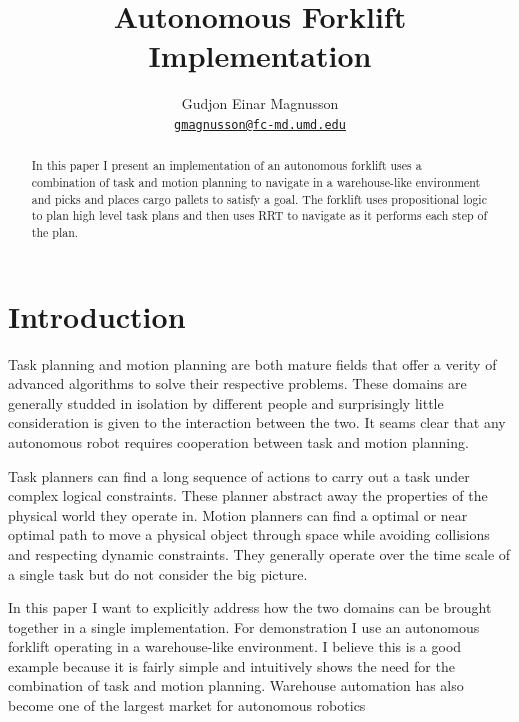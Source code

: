 \documentclass[letterpaper, 10 pt, conference]{ieeeconf}  %
\title{
Autonomous Forklift Implementation
}
\author{
Gudjon Einar Magnusson
\\ \href{mailto:gmagnusson@fc-md.umd.edu}{\tt\small gmagnusson@fc-md.umd.edu}
}
\begin{document}
\maketitle
\thispagestyle{empty}
\pagestyle{empty}


\begin{abstract}

In this paper I present an implementation of an autonomous forklift uses a combination of task and motion planning to navigate in a warehouse-like environment and picks and places cargo pallets to satisfy a goal. The forklift uses propositional logic to plan high level task plans and then uses RRT to navigate as it performs each step of the plan.

\end{abstract}


\section{Introduction}

Task planning and motion planning are both mature fields that offer a verity of advanced algorithms to solve their respective problems. These domains are generally studded in isolation by different people and surprisingly little consideration is given to the interaction between the two. It seams clear that any autonomous robot requires cooperation between task and motion planning.

Task planners can find a long sequence of actions to carry out a task under complex logical constraints. These planner abstract away the properties of the physical world they operate in.
Motion planners can find a optimal or near optimal path to move a physical object through space while avoiding collisions and respecting dynamic constraints. They generally operate over the time scale of a single task but do not consider the big picture.

In this paper I want to explicitly address how the two domains can be brought together in a single implementation. For demonstration I use an autonomous forklift operating in a warehouse-like environment. I believe this is a good example because it is fairly simple and intuitively shows the need for the combination of task and motion planning. Warehouse automation has also become one of the largest market for autonomous robotics
\end{document}
